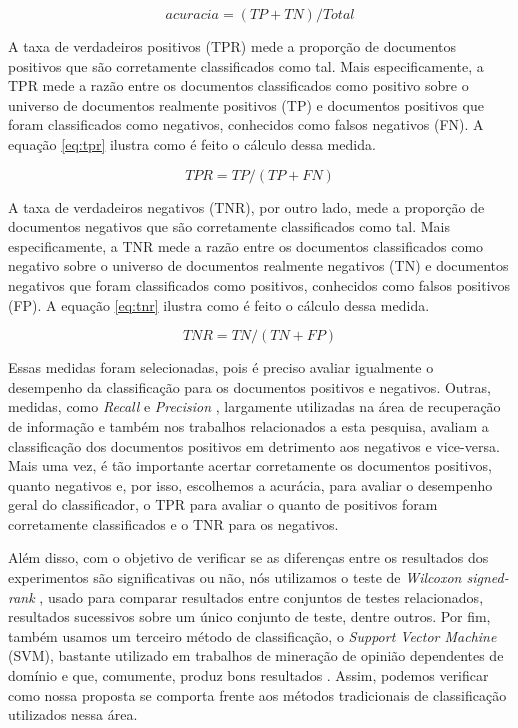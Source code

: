 \documentclass[template.tex]{subfiles}
\begin{document}
\begin{equation}
acuracia =  (TP + TN) / Total
\label{eq:acccuracy}
\end{equation}

A taxa de verdadeiros positivos (TPR) mede a proporção de documentos positivos que são corretamente classificados como tal. Mais especificamente, a TPR mede a razão entre os documentos classificados como positivo sobre o universo de documentos realmente positivos (TP) e documentos positivos que foram classificados como negativos, conhecidos como falsos negativos (FN). A equação \ref{eq:tpr} ilustra como é feito o cálculo dessa medida. 

\begin{equation}
TPR = TP / (TP + FN)
\label{eq:tpr}
\end{equation}

A taxa de verdadeiros negativos (TNR), por outro lado, mede a proporção de documentos negativos que são corretamente classificados como tal. Mais especificamente, a TNR mede a razão entre os documentos classificados como negativo sobre o universo de documentos realmente negativos (TN) e documentos negativos que foram classificados como positivos, conhecidos como falsos positivos (FP). A equação \ref{eq:tnr} ilustra como é feito o cálculo dessa medida. 

\begin{equation}
TNR = TN / (TN + FP)
\label{eq:tnr}
\end{equation}


Essas medidas foram selecionadas, pois é preciso avaliar igualmente o desempenho da classificação para os documentos positivos e negativos. Outras, medidas, como \textit{Recall} e \textit{Precision} \cite{zhu2004recall}, largamente utilizadas na área de recuperação de informação e também nos trabalhos relacionados a esta pesquisa, avaliam a classificação dos documentos positivos em detrimento aos negativos e vice-versa. Mais uma vez, é tão importante acertar corretamente os documentos positivos, quanto negativos e, por isso, escolhemos a acurácia, para avaliar o desempenho geral do classificador, o TPR para avaliar o quanto de positivos foram corretamente classificados e o TNR para os negativos.

Além disso, com o objetivo de verificar se as diferenças entre os resultados dos experimentos são significativas ou não, nós utilizamos o teste de \textit{Wilcoxon signed-rank} \cite{wilcoxon1945individual}, usado para comparar resultados entre conjuntos de testes relacionados, resultados sucessivos sobre um único conjunto de teste, dentre outros. Por fim, também usamos um terceiro método de classificação, o \textit{Support Vector Machine} (SVM), bastante utilizado em trabalhos de mineração de opinião dependentes de domínio e que, comumente, produz bons resultados \cite{ohana2009sentiment, moraes2012document}. Assim, podemos verificar como nossa proposta se comporta frente aos métodos tradicionais de classificação utilizados nessa área. 
\end{document}
